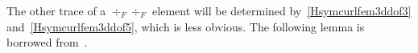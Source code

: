 The other trace of a $\div_F\div_F$ element will be determined by~\eqref{Hsymcurlfem3ddof3} and~\eqref{Hsymcurlfem3ddof5}, which is less obvious. The following lemma is borrowed from~\cite[Lemma 9 and Remark 8]{Hu;Liang;Ma:2021Finite}. 


